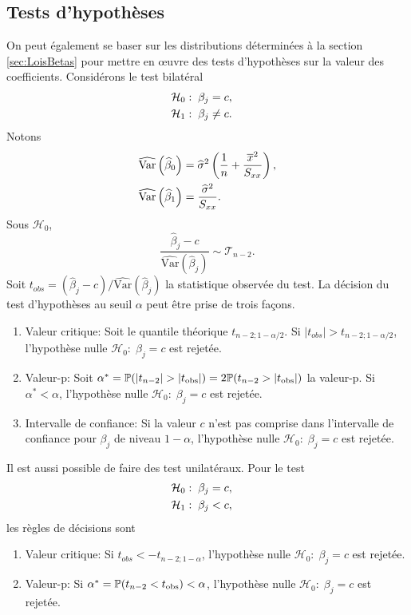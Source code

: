 \subsection{Tests d'hypothèses}

On peut également se baser sur les distributions déterminées à la section \ref{sec:LoisBetas} pour mettre en {\oe}uvre des tests d'hypothèses sur la valeur des coefficients. Considérons le test bilatéral
\begin{align*}
    \mathcal{H}_0&: \; \beta_j = c, \cr
    \mathcal{H}_1&: \; \beta_j \neq c.
\end{align*}
Notons 
\begin{align*}
    \widehat{\mathrm{Var}}\left(\widehat{\beta}_0\right)
    &= \widehat\sigma^2\left({1\over n}+{\overline{x}^2\over S_{xx}}\right), \\
    \widehat{\mathrm{Var}}\left(\widehat{\beta}_1\right)
    &= \frac{\widehat\sigma^2}{S_{xx}}.
\end{align*}
Sous $\mathcal{H}_0$, 
$$\frac{\widehat{\beta}_j - c}{\widehat{\mathrm{Var}}\left(\widehat{\beta}_j\right)} \sim \mathcal{T}_{n-2}.$$
Soit $t_{obs} = \left(\widehat{\beta}_j - c \right) \big/ \widehat{\mathrm{Var}}\left(\widehat{\beta}_j\right)$ la statistique observée du test. La décision du test d'hypothèses au seuil $\alpha$ peut être prise de trois façons.
\begin{enumerate}[label=(\roman*)]
    \item Valeur critique: Soit le quantile théorique $t_{n-2; 1-\alpha/2}$. Si $|t_{obs}| > t_{n-2; 1-\alpha/2}$, l'hypothèse nulle $\mathcal{H}_0: \; \beta_j = c$ est rejetée.
    \item Valeur-p: Soit $\alpha^* = \prob(|t_{n-2}|>|t_{\text{obs}}|) = 2 \prob(t_{n-2}>|t_{\text{obs}}|)$ la valeur-p. Si $\alpha^* < \alpha$,  l'hypothèse nulle $\mathcal{H}_0: \; \beta_j = c$ est rejetée.
    \item Intervalle de confiance: Si la valeur $c$ n'est pas comprise dans l'intervalle de confiance pour $\beta_j$ de niveau $1-\alpha$, l'hypothèse nulle $\mathcal{H}_0: \; \beta_j = c$ est rejetée.
\end{enumerate}
Il est aussi possible de faire des test unilatéraux. Pour le test
\begin{align*}
    \mathcal{H}_0&: \; \beta_j = c, \cr
    \mathcal{H}_1&: \; \beta_j < c,
\end{align*}
les règles de décisions sont
\begin{enumerate}[label=(\roman*)]
    \item Valeur critique: Si $t_{obs} < - t_{n-2; 1-\alpha}$, l'hypothèse nulle $\mathcal{H}_0: \; \beta_j = c$ est rejetée.
    \item Valeur-p: Si $\alpha^* = \mathbb{P}(t_{n-2}<t_{\text{obs}}) < \alpha$,  l'hypothèse nulle $\mathcal{H}_0: \; \beta_j = c$ est rejetée.
\end{enumerate}
